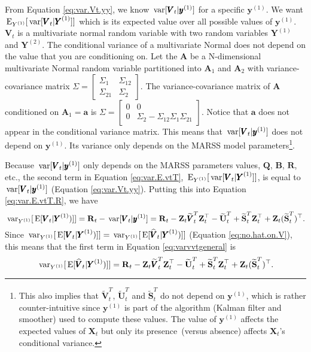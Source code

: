 \documentclass[]{article}
\def\UPS{\mbox{\boldmath $\Upsilon$}}
\def\XI{\mbox{\boldmath $\Xi$}}
\def\AA{\mbox{$\mathbf A$}}	\def\aa{\mbox{$\mathbf a$}}
\def\BB{\mbox{$\mathbf B$}}	\def\bb{\mbox{$\mathbf b$}} \def\Bb{\mbox{$\mathbf J$}} \def\Ba{\mbox{$\mathbf L$}} \def\Bm{\UPS}
\def\E{\,\textup{\textrm{E}}}
\def\QQ{\mbox{$\mathbf Q$}}	 \def\qq{\mbox{$\mathbf q$}} \def\Qb{\mbox{$\mathbf G$}}  \def\Qm{\mathbb{Q}}
\def\RR{\mbox{$\mathbf R$}}	 \def\rr{\mbox{$\mathbf r$}} \def\Rb{\mbox{$\mathbf H$}}	\def\Rm{\mathbb{R}}
\def\Ss{\mbox{$\mathbf S$}}
\def\UU{\mbox{$\mathbf U$}}	\def\uu{\mbox{$\mathbf u$}}
\def\VV{\mbox{$\pmb{V}$}}	\def\vv{\mbox{$\pmb{v}$}}
\def\XX{\mbox{$\pmb{X}$}}	\def\xx{\mbox{$\pmb{x}$}}
\def\YY{\mbox{$\pmb{Y}$}}	\def\yy{\mbox{$\pmb{y}$}}
\def\ZZ{\mbox{$\mathbf Z$}}	\def\zz{\mbox{$\mathbf z$}}	\def\Zb{\mbox{$\mathbf M$}} \def\Za{\mbox{$\mathbf N$}} \def\Zm{\XI}
\def\var{\,\textup{\textrm{var}}}
\def\hatVt{\widehat{\VV}_t}
\def\hatVtT{\widetilde{\VV}_t^T}
\def\hatUtT{\widetilde{\UU}_t^T}
\def\hatStT{\widetilde{\Ss}_t^T}
\begin{document}
From Equation \ref{eq:var.Vt.yy}, we know $\var[\VV_t|\yy^{(1)}]$ for a specific $\yy^{(1)}$. We want $\E_{Y^{(1)}}[\var[\VV_t|\YY^{(1)}]]$ which is its expected value over all possible values of $\yy^{(1)}$.  $\VV_t$ is a multivariate normal random variable with two random variables $\YY^{(1)}$ and $\YY^{(2)}$. The conditional variance of a multivariate Normal does not depend on the value that you are conditioning on. Let the $\AA$ be a N-dimensional multivariate Normal random variable partitioned into $\AA_1$ and $\AA_2$ with variance-covariance matrix $\Sigma = \begin{bmatrix}
\Sigma_1 & \Sigma_{12} \\
\Sigma_21 & \Sigma_{2}
\end{bmatrix}$.  The variance-covariance matrix of $\AA$ conditioned on $\AA_1=\aa$ is $\Sigma = \begin{bmatrix}
0 & 0 \\
0 & \Sigma_2 - \Sigma_{12}\Sigma_{1}\Sigma_{21}
\end{bmatrix}$. Notice that $\aa$ does not appear in the conditional variance matrix. This means that $\var[\VV_t|\yy^{(1)}]$ does not depend on $\yy^{(1)}$. Its variance only depends on the MARSS model parameters\footnote{This also implies that $\hatVtT$, $\hatUtT$ and $\hatStT$ do not depend on $\yy^{(1)}$, which is rather counter-intuitive since $\yy^{(1)}$ is part of the algorithm (Kalman filter and smoother) used to compute these values. The value of $\yy^{(1)}$ affects the expected values of $\XX_t$ but only its presence\ (versus absence) affects $\XX_t$'s conditional variance.}.

Because $\var[\VV_t|\yy^{(1)}]$ only depends on the MARSS parameters values, $\QQ$, $\BB$, $\RR$, etc., the second term in Equation \ref{eq:var.E.vtT}, $\E_{Y^{(1)}}[\var[\VV_t|\YY^{(1)}]]$, is equal to $\var[\VV_t|\yy^{(1)}]$ (Equation \ref{eq:var.Vt.yy}). Putting this into Equation \ref{eq:var.E.vtT.R}, we have
\begin{equation}\label{eq:conditionalvtfinala}
\var_{Y^{(1)}}[\E[\VV_t|\YY^{(1)})]]  = \RR_t - \var[\VV_t|\yy^{(1)}] = \RR_t - \ZZ_t \hatVtT \ZZ_t^\top - \hatUtT + \hatStT\ZZ_t^\top + \ZZ_t(\hatStT)^\top.
\end{equation}
Since $\var_{Y^{(1)}}[\E[\VV_t|\YY^{(1)})]] = \var_{Y^{(1)}}[\E[\hatVt|\YY^{(1)})]]$ (Equation \ref{eq:no.hat.on.V}), this means that the first term in Equation \ref{eq:varvvtgeneral} is
\begin{equation}\label{eq:conditionalvtfinal}
\var_{Y^{(1)}}[\E[\hatVt|\YY^{(1)})]]  =  \RR_t - \ZZ_t \hatVtT \ZZ_t^\top - \hatUtT + \hatStT\ZZ_t^\top + \ZZ_t(\hatStT)^\top.
\end{equation}
\end{document}

